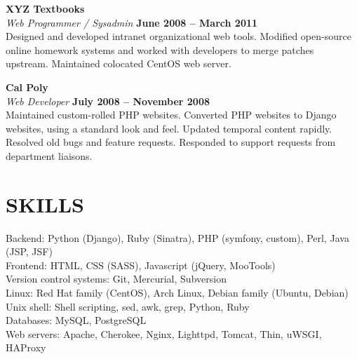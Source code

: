 \documentclass[margin,line]{resume}
\begin{document}
\begin{resume}
    \textbf{\listing XYZ Textbooks} \vspace{2mm}\\\vspace{1mm}%
    \textsl{Web Programmer / Sysadmin} \hfill \textbf{June 2008 -- March 2011}\\
    Designed and developed intranet organizational web tools.
    Modified open-source online homework systems and worked with developers to merge patches upstream.
    Maintained colocated CentOS web server.
    
    \textbf{\listing Cal Poly} \vspace{2mm}\\\vspace{1mm}%
    \textsl{Web Developer} \hfill \textbf{July 2008 -- November 2008}\\
    Maintained custom-rolled PHP websites.
    Converted PHP websites to Django websites, using a standard look and feel.
    Updated temporal content rapidly.
    Resolved old bugs and feature requests.
    Responded to support requests from department liaisons.

\sectionline

    \section{\mysidestyle \textbf{\large{S}\small{KILLS}}}

    Backend: Python (Django), Ruby (Sinatra), PHP (symfony, custom), Perl, Java (JSP, JSF)\\
    Frontend: HTML, CSS (SASS), Javascript (jQuery, MooTools)\\
    Version control systems: Git, Mercurial, Subversion\\
    Linux: Red Hat family (CentOS), Arch Linux, Debian family (Ubuntu, Debian)\\
    Unix shell: Shell scripting, sed, awk, grep, Python, Ruby\\
    Databases: MySQL, PostgreSQL\\
    Web servers: Apache, Cherokee, Nginx, Lighttpd, Tomcat, Thin, uWSGI, HAProxy\\

\sectionline


\end{resume}
\end{document}
